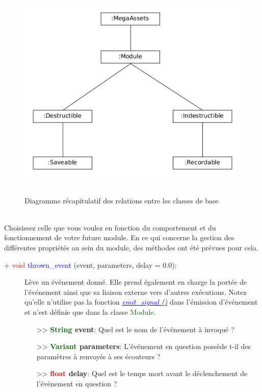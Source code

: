 \documentclass[a4paper, 11pt]{article}
\begin{document}
	\begin{figure}[h]
		\begin{center}
			\includegraphics[width = 350pt, height = 300pt]{module_creation_structure.png}
		\end{center} \caption{Diagramme récapitulatif des relations entre les classes de base}
		\label{Diagramme récapitulatif des relations entre les classes de base}
	\end{figure}
	\\Choisissez celle que vous voulez en fonction du comportement et du fonctionnement de votre future
	module. En ce qui concerne la gestion des différentes propriétés au sein du module, des méthodes ont été
	prévues pour cela.\\
	\begin{description}
		\item [+ \textcolor{red}{void} \textcolor{blue}{thrown\_event} (event, parameters, delay = 0.0):]
		Lève un événement donné. Elle prend également en charge la portée de l'événement ainsi que sa 
		liaison externe vers d'autres exécutions. Notez qu'elle n'utilise pas la fonction
		\href{https://docs.godotengine.org/en/stable/classes/class_object.html#class-object-method-emit-signal}{\textit{\textcolor{blue}{emit\_signal ()}}} dans l'émission d'événement et n'est définie que dans la 
		classe \textcolor{darkgreen}{Module}.
		\begin{itemize}
			\item [>> \textbf{\textcolor{darkgreen}{String} event}:] Quel est le nom de l'événement à
			invoqué ?
			\item [>> \textbf{\textcolor{darkgreen}{Variant} parameters}:] L'événement en question possède
			t-il des paramètres à renvoyés à ses écouteurs ?
			\item [>> \textbf{\textcolor{red}{float} delay}:] Quel est le temps mort avant le déclenchement
			de l'événement en question ?\\
		\end{itemize}
	\end{description}
\end{document}
